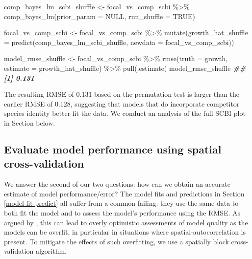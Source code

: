 \documentclass[12pt]{article}
\newenvironment{Shaded}{\begin{snugshade}}{\end{snugshade}}
\newcommand{\AttributeTok}[1]{\textcolor[rgb]{0.77,0.63,0.00}{#1}}
\newcommand{\ConstantTok}[1]{\textcolor[rgb]{0.00,0.00,0.00}{#1}}
\newcommand{\DocumentationTok}[1]{\textcolor[rgb]{0.56,0.35,0.01}{\textbf{\textit{#1}}}}
\newcommand{\FunctionTok}[1]{\textcolor[rgb]{0.00,0.00,0.00}{#1}}
\newcommand{\NormalTok}[1]{#1}
\newcommand{\OtherTok}[1]{\textcolor[rgb]{0.56,0.35,0.01}{#1}}
\newcommand{\SpecialCharTok}[1]{\textcolor[rgb]{0.00,0.00,0.00}{#1}}
\begin{document}
\begin{Shaded}
\begin{Highlighting}[]
\NormalTok{comp\_bayes\_lm\_scbi\_shuffle }\OtherTok{\textless{}{-}}\NormalTok{ focal\_vs\_comp\_scbi }\SpecialCharTok{\%\textgreater{}\%}
  \FunctionTok{comp\_bayes\_lm}\NormalTok{(}\AttributeTok{prior\_param =} \ConstantTok{NULL}\NormalTok{, }\AttributeTok{run\_shuffle =} \ConstantTok{TRUE}\NormalTok{)}

\NormalTok{focal\_vs\_comp\_scbi }\OtherTok{\textless{}{-}}\NormalTok{ focal\_vs\_comp\_scbi }\SpecialCharTok{\%\textgreater{}\%}
  \FunctionTok{mutate}\NormalTok{(}\AttributeTok{growth\_hat\_shuffle =} \FunctionTok{predict}\NormalTok{(comp\_bayes\_lm\_scbi\_shuffle, }\AttributeTok{newdata =}\NormalTok{ focal\_vs\_comp\_scbi))}
\end{Highlighting}
\end{Shaded}

\begin{Shaded}
\begin{Highlighting}[]
\NormalTok{model\_rmse\_shuffle }\OtherTok{\textless{}{-}}\NormalTok{ focal\_vs\_comp\_scbi }\SpecialCharTok{\%\textgreater{}\%}
  \FunctionTok{rmse}\NormalTok{(}\AttributeTok{truth =}\NormalTok{ growth, }\AttributeTok{estimate =}\NormalTok{ growth\_hat\_shuffle) }\SpecialCharTok{\%\textgreater{}\%}
  \FunctionTok{pull}\NormalTok{(.estimate)}
\NormalTok{model\_rmse\_shuffle}
\DocumentationTok{\#\# [1] 0.131}
\end{Highlighting}
\end{Shaded}

The resulting RMSE of 0.131 based on the permutation test is larger than
the earlier RMSE of 0.128, suggesting that models that do incorporate
competitor species identity better fit the data. We conduct an analysis
of the full SCBI plot in Section below.

\hypertarget{spatial-cross-validation}{%
\subsection{Evaluate model performance using spatial
cross-validation}\label{spatial-cross-validation}}

We answer the second of our two questions: how can we obtain an accurate
estimate of model performance/error? The model fits and predictions in
Section \ref{model-fit-predict} all suffer from a common failing: they
use the same data to both fit the model and to assess the model's
performance using the RMSE. As argued by
\citet{roberts_cross-validation_2017}, this can lead to overly
optimistic assessments of model quality as the models can be overfit, in
particular in situations where spatial-autocorrelation is present. To
mitigate the effects of such overfitting, we use a spatially block
cross-validation algorithm.
\end{document}
